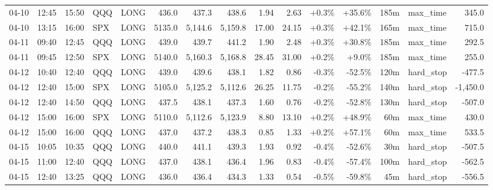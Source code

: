 \documentclass[11pt,a4paper,twoside]{article}
\begin{document}
\begin{landscape}
\begin{center}
\begin{longtable}{>{\color{txtmain}}l l l l l r r r r r r r r >{\color{txtmain}}l r}
04-10 & 12:45 & 15:50 & QQQ & LONG & 436.0 & 437.3 & 438.6 & 1.94 & 2.63 & \textcolor{wingreen}{+0.3\%} & \textcolor{wingreen}{+35.6\%} & 185m & max\_time & \textcolor{wingreen}{345.0} \\
04-10 & 13:15 & 16:00 & SPX & LONG & 5135.0 & 5,144.6 & 5,159.8 & 17.00 & 24.15 & \textcolor{wingreen}{+0.3\%} & \textcolor{wingreen}{+42.1\%} & 165m & max\_time & \textcolor{wingreen}{715.0} \\
04-11 & 09:40 & 12:45 & QQQ & LONG & 439.0 & 439.7 & 441.2 & 1.90 & 2.48 & \textcolor{wingreen}{+0.3\%} & \textcolor{wingreen}{+30.8\%} & 185m & max\_time & \textcolor{wingreen}{292.5} \\
04-11 & 09:45 & 12:50 & SPX & LONG & 5140.0 & 5,160.3 & 5,168.8 & 28.45 & 31.00 & \textcolor{wingreen}{+0.2\%} & \textcolor{wingreen}{+9.0\%} & 185m & max\_time & \textcolor{wingreen}{255.0} \\
04-12 & 10:40 & 12:40 & QQQ & LONG & 439.0 & 439.6 & 438.1 & 1.82 & 0.86 & \textcolor{lossred}{-0.3\%} & \textcolor{lossred}{-52.5\%} & 120m & hard\_stop & \textcolor{lossred}{-477.5} \\
04-12 & 12:40 & 15:00 & SPX & LONG & 5105.0 & 5,125.2 & 5,112.6 & 26.25 & 11.75 & \textcolor{lossred}{-0.2\%} & \textcolor{lossred}{-55.2\%} & 140m & hard\_stop & \textcolor{lossred}{-1,450.0} \\
04-12 & 12:40 & 14:50 & QQQ & LONG & 437.5 & 438.1 & 437.3 & 1.60 & 0.76 & \textcolor{lossred}{-0.2\%} & \textcolor{lossred}{-52.8\%} & 130m & hard\_stop & \textcolor{lossred}{-507.0} \\
04-12 & 15:00 & 16:00 & SPX & LONG & 5110.0 & 5,112.6 & 5,123.9 & 8.80 & 13.10 & \textcolor{wingreen}{+0.2\%} & \textcolor{wingreen}{+48.9\%} & 60m & max\_time & \textcolor{wingreen}{430.0} \\
04-12 & 15:00 & 16:00 & QQQ & LONG & 437.0 & 437.2 & 438.3 & 0.85 & 1.33 & \textcolor{wingreen}{+0.2\%} & \textcolor{wingreen}{+57.1\%} & 60m & max\_time & \textcolor{wingreen}{533.5} \\
04-15 & 10:05 & 10:35 & QQQ & LONG & 440.0 & 441.1 & 439.3 & 1.93 & 0.92 & \textcolor{lossred}{-0.4\%} & \textcolor{lossred}{-52.6\%} & 30m & hard\_stop & \textcolor{lossred}{-507.5} \\
04-15 & 11:00 & 12:40 & QQQ & LONG & 437.0 & 438.1 & 436.4 & 1.96 & 0.83 & \textcolor{lossred}{-0.4\%} & \textcolor{lossred}{-57.4\%} & 100m & hard\_stop & \textcolor{lossred}{-562.5} \\
04-15 & 12:40 & 13:25 & QQQ & LONG & 436.0 & 436.4 & 434.3 & 1.33 & 0.54 & \textcolor{lossred}{-0.5\%} & \textcolor{lossred}{-59.8\%} & 45m & hard\_stop & \textcolor{lossred}{-556.5} \\

\end{longtable}
\end{center}
\end{landscape}
\end{document}
